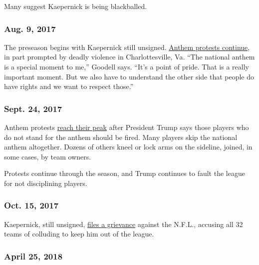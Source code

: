 Many suggest Kaepernick is being blackballed.

\hypertarget{aug-9-2017}{%
\subsubsection{\texorpdfstring{\textbf{Aug. 9,
2017}}{Aug. 9, 2017}}\label{aug-9-2017}}

The preseason begins with Kaepernick still unsigned.
\href{https://www.nytimes.com/2017/08/18/sports/football/malcolm-jenkins-chris-long-eagles-anthem-protest.html}{Anthem
protests continue}, in part prompted by deadly violence in
Charlottesville, Va. ``The national anthem is a special moment to me,''
Goodell says. ``It's a point of pride. That is a really important
moment. But we also have to understand the other side that people do
have rights and we want to respect those.''

\hypertarget{sept-24-2017}{%
\subsubsection{\texorpdfstring{\textbf{Sept. 24,
2017}}{Sept. 24, 2017}}\label{sept-24-2017}}

Anthem protests
\href{https://www.nytimes.com/2017/09/24/sports/trump-national-anthem-nfl.html}{reach
their peak} after President Trump says those players who do not stand
for the anthem should be fired. Many players skip the national anthem
altogether. Dozens of others kneel or lock arms on the sideline, joined,
in some cases, by team owners.

Protests continue through the season, and Trump continues to fault the
league for not disciplining players.

\hypertarget{oct-15-2017}{%
\subsubsection{\texorpdfstring{\textbf{Oct. 15,
2017}}{Oct. 15, 2017}}\label{oct-15-2017}}

Kaepernick, still unsigned,
\href{https://www.nytimes.com/2017/10/15/sports/colin-kaepernick-nfl-collusion.html}{files
a grievance} against the N.F.L., accusing all 32 teams of colluding to
keep him out of the league.

\hypertarget{april-25-2018}{%
\subsubsection{\texorpdfstring{\textbf{April 25,
2018}}{April 25, 2018}}\label{april-25-2018}}

